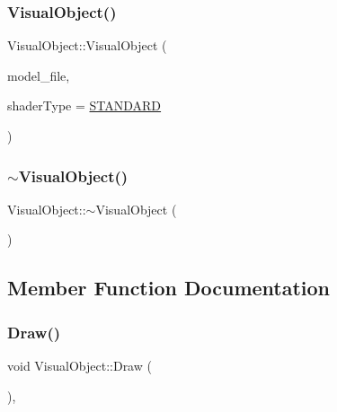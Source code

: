 \subsubsection{\texorpdfstring{VisualObject()}{VisualObject()}}
{\footnotesize\ttfamily Visual\+Object\+::\+Visual\+Object (\begin{DoxyParamCaption}\item[{G\+Lchar $\ast$}]{model\+\_\+file,  }\item[{\mbox{\hyperlink{_game_object_8h_a6230e1b9ecbf2d82d10856fd7e1fde46}{Shader\+Type}}}]{shader\+Type = {\ttfamily \mbox{\hyperlink{_texture_8h_a65468556d79304b3a4bfc464cc12e549a94e94133f4bdc1794c6b647b8ea134d0}{S\+T\+A\+N\+D\+A\+RD}}} }\end{DoxyParamCaption})}

\mbox{\label{class_visual_object_a068ba11545322d81d9ad8c675c4233f9}} 
\subsubsection{\texorpdfstring{$\sim$VisualObject()}{~VisualObject()}}
{\footnotesize\ttfamily Visual\+Object\+::$\sim$\+Visual\+Object (\begin{DoxyParamCaption}{ }\end{DoxyParamCaption})}



\subsection{Member Function Documentation}
\mbox{\label{class_visual_object_a10c0e01e375fd4af08e57f3475dd312c}} 
\subsubsection{\texorpdfstring{Draw()}{Draw()}}
{\footnotesize\ttfamily void Visual\+Object\+::\+Draw (\begin{DoxyParamCaption}{ }\end{DoxyParamCaption})\hspace{0.3cm}{\ttfamily [override]}, {\ttfamily [virtual]}}



